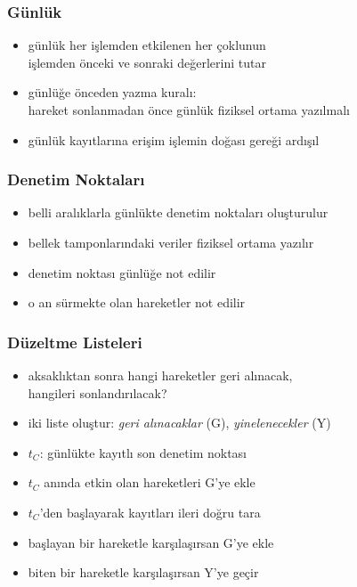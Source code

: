 \documentclass[dvipsnames]{beamer}
\theoremstyle{plain}
\begin{document}
\begin{frame}
  \frametitle{Günlük}

  \begin{itemize}
    \item \alert{günlük} her işlemden etkilenen her çoklunun\\
      işlemden önceki ve sonraki değerlerini tutar

    \pause
    \medskip
    \item \alert{günlüğe önceden yazma kuralı}:\\
      hareket sonlanmadan önce günlük fiziksel ortama yazılmalı

    \pause
    \medskip
    \item günlük kayıtlarına erişim işlemin doğası gereği ardışıl
  \end{itemize}
\end{frame}

\begin{frame}
  \frametitle{Denetim Noktaları}

  \begin{itemize}
    \item belli aralıklarla günlükte \alert{denetim noktaları} oluşturulur

    \medskip
    \item bellek tamponlarındaki veriler fiziksel ortama yazılır
    \item denetim noktası günlüğe not edilir
    \item o an sürmekte olan hareketler not edilir
  \end{itemize}
\end{frame}

\begin{frame}
  \frametitle{Düzeltme Listeleri}

  \begin{itemize}
    \item aksaklıktan sonra hangi hareketler geri alınacak,\\
      hangileri sonlandırılacak?
    \item iki liste oluştur: \emph{geri alınacaklar} (G),
        \emph{yinelenecekler} (Y)

    \pause
    \medskip
    \item $t_C$: günlükte kayıtlı son denetim noktası
    \item $t_C$ anında etkin olan hareketleri G'ye ekle

    \medskip
    \item $t_C$'den başlayarak kayıtları ileri doğru tara
    \item başlayan bir hareketle karşılaşırsan G'ye ekle
    \item biten bir hareketle karşılaşırsan Y'ye geçir
  \end{itemize}
\end{frame}
\end{document}
